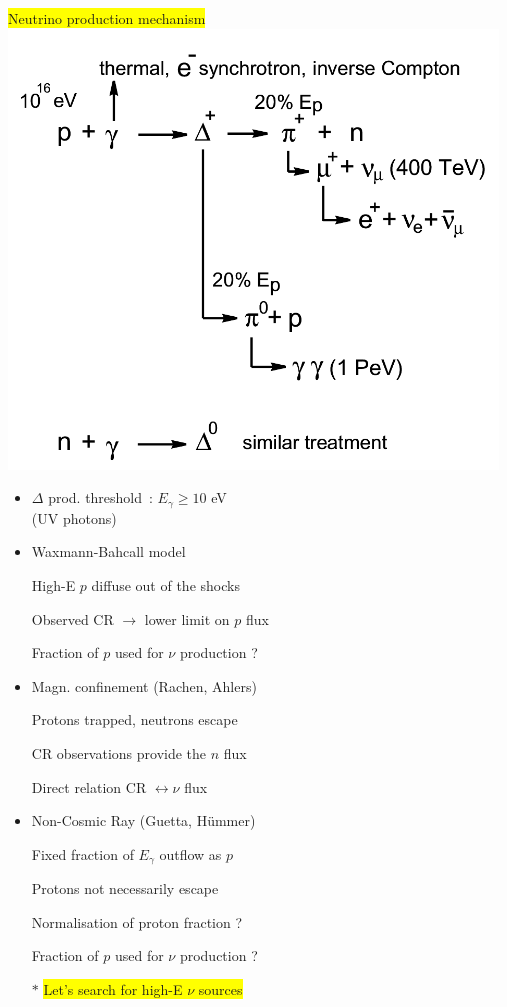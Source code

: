\twocolumn
\begin{center}
\colorbox{yellow}{Neutrino production mechanism}\\
\includegraphics[keepaspectratio,width=13cm]{grb-engine2}
\end{center}
%
\begin{itemize}
\item $\Delta$ prod. threshold~: $E_{\gamma} \ge 10$ eV\\
      (UV photons)
\end{itemize}

\newpage
%
\begin{itemize}
\item Waxmann-Bahcall model
\item[] High-E $p$ diffuse out of the shocks
\item[] Observed CR $\rightarrow$ lower limit on $p$ flux 
\item[] {\blue Fraction of $p$ used for $\nu$ production ?}
\item Magn. confinement (Rachen, Ahlers)
\item[] Protons trapped, neutrons escape
\item[] CR observations provide the $n$ flux 
\item[] {\blue Direct relation CR $\leftrightarrow \nu$ flux}
\item Non-Cosmic Ray (Guetta, H\"{u}mmer)
\item[] Fixed fraction of $E_{\gamma}$ outflow as $p$
\item[] Protons not necessarily escape
\item[] {\blue Normalisation of proton fraction ?}
\item[] {\blue Fraction of $p$ used for $\nu$ production ?}
\item[$\ast$] \colorbox{yellow}{Let's search for high-E $\nu$ sources}
\end{itemize}

